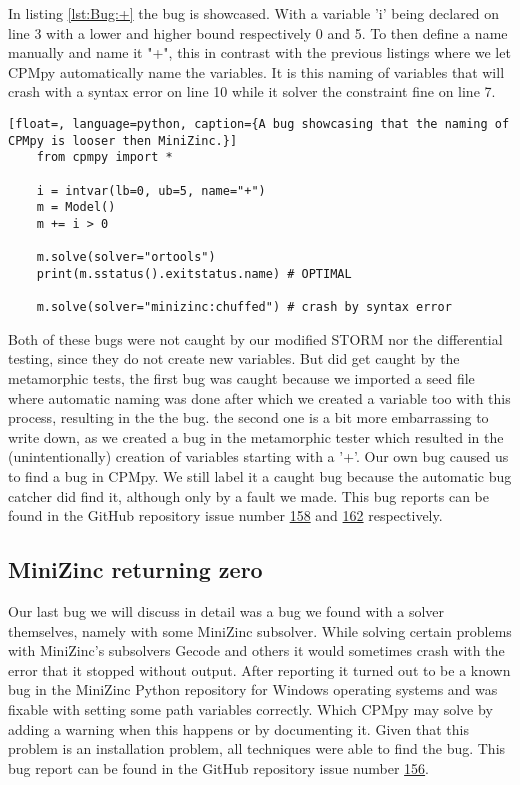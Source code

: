 In listing \ref{lst:Bug:+} the bug is showcased. With a variable 'i' being declared on line 3 with a lower and higher bound respectively 0 and 5. To then define a name manually and name it "+", this in contrast with the previous listings where we let CPMpy automatically name the variables. It is this naming of variables that will crash with a syntax error on line 10 while it solver the constraint fine on line 7. 

\label{lst:Bug:+}
\begin{lstlisting}[float=, language=python, caption={A bug showcasing that the naming of CPMpy is looser then MiniZinc.}]
	from cpmpy import *
	
	i = intvar(lb=0, ub=5, name="+")
	m = Model()
	m += i > 0
	
	m.solve(solver="ortools")
	print(m.sstatus().exitstatus.name) # OPTIMAL
	
	m.solve(solver="minizinc:chuffed") # crash by syntax error
\end{lstlisting}

Both of these bugs were not caught by our modified STORM nor the differential testing, since they do not create new variables. But did get caught by the metamorphic tests, the first bug was caught because we imported a seed file where automatic naming was done after which we created a variable too with this process, resulting in the the bug. the second one is a bit more embarrassing to write down, as we created a bug in the metamorphic tester which resulted in the (unintentionally) creation of variables starting with a '+'. Our own bug caused us to find a bug in CPMpy. We still label it a caught bug because the automatic bug catcher did find it, although only by a fault we made. This bug reports can be found in the GitHub repository issue number \href{https://github.com/CPMpy/cpmpy/issues/158}{158} and \href{https://github.com/CPMpy/cpmpy/issues/162}{162} respectively.


\subsection{MiniZinc returning zero}
\label{res:bug:MinizincZero}
Our last bug we will discuss in detail was a bug we found with a solver themselves, namely with some MiniZinc subsolver. While solving certain problems with MiniZinc's subsolvers Gecode and others it would sometimes crash with the error that it stopped without output. After reporting it turned out to be a known bug in the MiniZinc Python repository for Windows operating systems and was fixable with setting some path variables correctly. Which CPMpy may solve by adding a warning when this happens or by documenting it.
Given that this problem is an installation problem, all techniques were able to find the bug. This bug report can be found in the GitHub repository issue number \href{https://github.com/CPMpy/cpmpy/issues/156}{156}.

